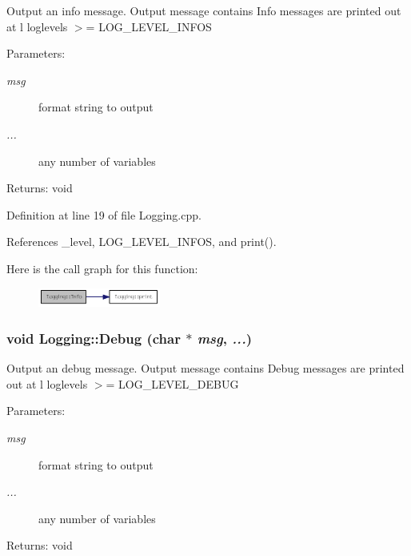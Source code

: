 Output an info message. Output message contains Info messages are printed out at l loglevels $>$= LOG\_\-LEVEL\_\-INFOS

\begin{Desc}
\item[Parameters:]
\begin{description}
\item[{\em msg}]format string to output \item[{\em ...}]any number of variables \end{description}
\end{Desc}
\begin{Desc}
\item[Returns:]void \end{Desc}


Definition at line 19 of file Logging.cpp.

References \_\-level, LOG\_\-LEVEL\_\-INFOS, and print().

Here is the call graph for this function:\nopagebreak
\begin{figure}[H]
\begin{center}
\leavevmode
\includegraphics[width=114pt]{class_logging_8a99e1a55e2b24d864d89e9aa86b2f2e_cgraph}
\end{center}
\end{figure}
\hypertarget{class_logging_e0fcd9e5350d7b9158c8ae9289fef193}{
\subsubsection[Debug]{\setlength{\rightskip}{0pt plus 5cm}void Logging::Debug (char $\ast$ {\em msg}, \/   {\em ...})}}
\label{class_logging_e0fcd9e5350d7b9158c8ae9289fef193}


Output an debug message. Output message contains Debug messages are printed out at l loglevels $>$= LOG\_\-LEVEL\_\-DEBUG

\begin{Desc}
\item[Parameters:]
\begin{description}
\item[{\em msg}]format string to output \item[{\em ...}]any number of variables \end{description}
\end{Desc}
\begin{Desc}
\item[Returns:]void \end{Desc}



